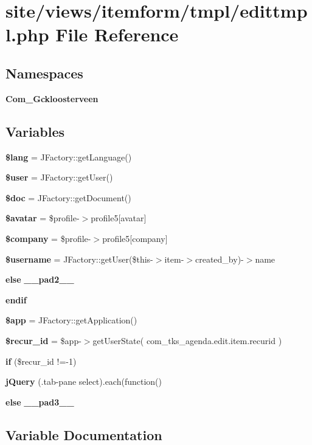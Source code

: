 \section{site/views/itemform/tmpl/edittmpl.php File Reference}
\label{edittmpl_8php}
\subsection*{Namespaces}
\begin{DoxyCompactItemize}
\item 
 \textbf{ Com\+\_\+\+Gckloosterveen}
\end{DoxyCompactItemize}
\subsection*{Variables}
\begin{DoxyCompactItemize}
\item 
\textbf{ \$lang} = J\+Factory\+::get\+Language()
\item 
\textbf{ \$user} = J\+Factory\+::get\+User()
\item 
\textbf{ \$doc} = J\+Factory\+::get\+Document()
\item 
\textbf{ \$avatar} = \$profile-\/$>$profile5[\textquotesingle{}avatar\textquotesingle{}]
\item 
\textbf{ \$company} = \$profile-\/$>$profile5[\textquotesingle{}company\textquotesingle{}]
\item 
\textbf{ \$username} = J\+Factory\+::get\+User(\$this-\/$>$item-\/$>$created\+\_\+by)-\/$>$name
\item 
\textbf{ else} \textbf{ \+\_\+\+\_\+pad2\+\_\+\+\_\+}
\item 
\textbf{ endif}
\item 
\textbf{ \$app} = J\+Factory\+::get\+Application()
\item 
\textbf{ \$recur\+\_\+id} = \$app-\/$>$get\+User\+State( \textquotesingle{}com\+\_\+tks\+\_\+agenda.\+edit.\+item.\+recurid\textquotesingle{} )
\item 
\textbf{ if} (\$recur\+\_\+id !=-\/1)
\item 
\textbf{ j\+Query} (\textquotesingle{}.tab-\/pane select\textquotesingle{}).each(function()
\item 
\textbf{ else} \textbf{ \+\_\+\+\_\+pad3\+\_\+\+\_\+}
\end{DoxyCompactItemize}


\subsection{Variable Documentation}
\mbox{\label{edittmpl_8php_adfb117f244076aa9bc269269f7e57403}} 
